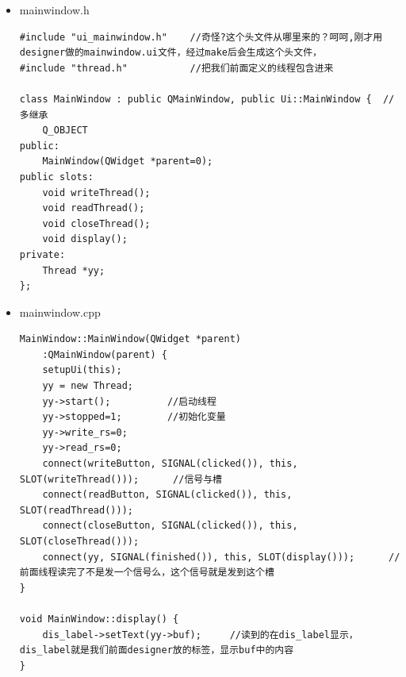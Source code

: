 \documentclass[9pt,b5paper]{article}
\begin{document}
\begin{itemize}
\begin{lstlisting}
    while (stopped) {     // stopped 为 0 时将退出线程     
        if (write_rs) {   // write_rs 为 1 时把字符串从串口中输出     
            write_rs = 0;     
            write(fd, "QtEmbedded-4.5.1", 16);  //向串口中写入字符，通过串口调试助手可看到QtEmbedded-4.5.1这个字符     
        }     
        if (read_rs) {                          //read_rs 为 1 时读取，并存在buf     
            read_rs = 0;     
            res = read(fd, buf, 10);     //读取串口的数据到buf     
            buf[res] = 0;     
            emit finished();                      //读完后发一个信号     
        }     
    }     

    printf("Close...\n");     
    tcsetattr(fd, TCSANOW, &oldtio);      //重新设置回原来的     
    close(fd);     
    quit();     
}
\end{lstlisting}
\item mainwindow.h

\lstset{language=java,label= ,caption= ,numbers=none}
\begin{lstlisting}
#include "ui_mainwindow.h"    //奇怪?这个头文件从哪里来的？呵呵,刚才用designer做的mainwindow.ui文件，经过make后会生成这个头文件，     
#include "thread.h"           //把我们前面定义的线程包含进来     

class MainWindow : public QMainWindow, public Ui::MainWindow {  //多继承     
    Q_OBJECT     
public:     
    MainWindow(QWidget *parent=0);     
public slots:     
    void writeThread();     
    void readThread();     
    void closeThread();     
    void display();    
private:     
    Thread *yy;     
};
\end{lstlisting}
\item mainwindow.cpp

\lstset{language=java,label= ,caption= ,numbers=none}
\begin{lstlisting}
MainWindow::MainWindow(QWidget *parent)     
    :QMainWindow(parent) {     
    setupUi(this);     
    yy = new Thread;     
    yy->start();          //启动线程     
    yy->stopped=1;        //初始化变量     
    yy->write_rs=0;     
    yy->read_rs=0;     
    connect(writeButton, SIGNAL(clicked()), this, SLOT(writeThread()));      //信号与槽     
    connect(readButton, SIGNAL(clicked()), this, SLOT(readThread()));     
    connect(closeButton, SIGNAL(clicked()), this, SLOT(closeThread()));     
    connect(yy, SIGNAL(finished()), this, SLOT(display()));      //前面线程读完了不是发一个信号么，这个信号就是发到这个槽     
}

void MainWindow::display() {     
    dis_label->setText(yy->buf);     //读到的在dis_label显示，dis_label就是我们前面designer放的标签，显示buf中的内容     
}     


\end{lstlisting}
\end{itemize}
\end{document}

